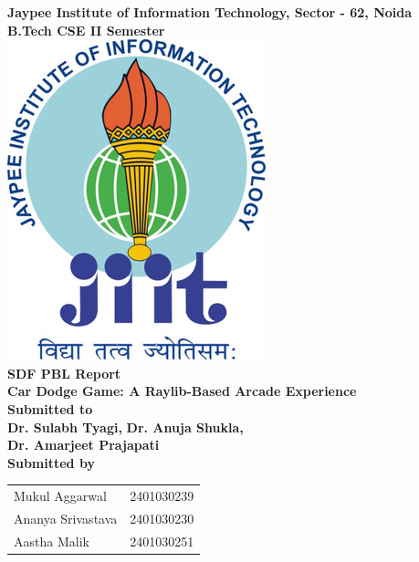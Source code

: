 \documentclass[12pt,a4paper]{article}
\begin{document}
\begin{titlepage}
    \centering
    \Huge
    \textbf{Jaypee Institute of Information Technology, Sector - 62, Noida} \\
    \vspace{0.5cm}
    \Large
    \textbf{B.Tech CSE II Semester} \\
    \vspace{1cm}
    \vspace*{\fill}
    \includegraphics[scale=3]{jiit_logo} \\
    \vspace{1.5cm}
    \Huge
    \textbf{SDF PBL Report} \\
    \Large
    \textbf{Car Dodge Game: A Raylib-Based Arcade Experience} \\
    \vspace{1cm}
    \Large
    \textbf{Submitted to} \\
    \textbf{Dr. Sulabh Tyagi,}
    \textbf{Dr. Anuja Shukla,}\\
    \textbf{Dr. Amarjeet Prajapati} \\
    \vspace{1cm}
    \textbf{Submitted by} \\
    \vspace{0.5cm}
    \begin{tabular}{ll}
        Mukul Aggarwal & 2401030239 \\
        Ananya Srivastava & 2401030230 \\
        Aastha Malik & 2401030251 \\
    \end{tabular}
    \vspace*{\fill}
    \normalsize
\end{titlepage}
\end{document}
